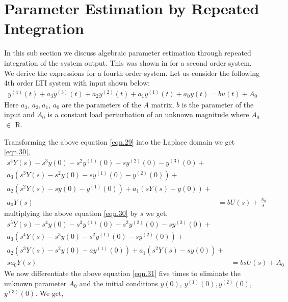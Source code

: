 \documentclass[letterpaper%
, twoside%
, 12pt%
,memoire%
, english%
,creativecommons,hyperref%
]{thETS}
\begin{document}
\section{Parameter Estimation by Repeated Integration \citep{fliess2003algebraic}} \label{Sec:App3}
In this sub section we discuss algebraic parameter estimation through repeated integration of the system output. This was shown in \citep{fliess2003algebraic} for a second order system. We derive the expressions for a fourth order system. Let us consider the following 4th order LTI system with input shown below:
\begin{equation}\label{eqn.29}
\begin{split}
y^{(4)}(t)+a_{3}y^{(3)}(t)+a_{2}y^{(2)}(t)+a_{1}y^{(1)}(t)+a_{0}y(t) = b u(t) +A_{0}
\end{split}
\end{equation}
Here $a_{3}$, $a_{2}, a_{1}$, $a_{0}$ are the parameters of the $A$ matrix, $b$ is the parameter of the input and $A_{0}$ is a constant load perturbation of an unknown magnitude where $A_{0}$ $\in$ $\mathrm{R}$.
\par Transforming the above equation \eqref{eqn.29} into the Laplace domain we get \eqref{eqn.30},
\begin{equation}\label{eqn.30}
\begin{split}
s^4Y(s) - s^3y(0) - s^2y^{(1)}(0) - sy^{(2)}(0) - y^{(3)}(0) + & \\
a_{3}(s^3Y(s) - s^2y(0) - sy^{(1)}(0) - y^{(2)}(0)) + & \\
a_{2}(s^2Y(s) - sy(0) - y^{(1)}(0)) + a_{1}(sY(s)-y(0)) + & \\
a_{0}Y(s) &= b U(s) + \frac{A_{0}}{s}
\end{split}
\end{equation}
multiplying the above equation \eqref{eqn.30} by $s$ we get,
\begin{equation}\label{eqn.31}
\begin{split}
s^5Y(s) - s^4y(0) - s^3y^{(1)}(0) - s^2y^{(2)}(0) - sy^{(3)}(0) + & \\
a_{3}(s^4Y(s) - s^3y(0) - s^2y^{(1)}(0) - sy^{(2)}(0)) + & \\
a_{2}(s^3Y(s) - s^2y(0) - ay^{(1)}(0)) + a_{1}(s^2Y(s)-sy(0)) + &\\
sa_{0}Y(s) &= bs U(s) + A_{0}
\end{split}
\end{equation}
We now differentiate the above equation \eqref{eqn.31} five times to eliminate the unknown parameter $A_{0}$ and the initial conditions $y(0)$, $y^{(1)}(0), y^{(2)}(0)$, $y^{(3)}(0)$. We get,
\end{document}
